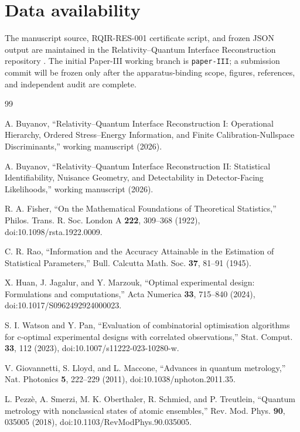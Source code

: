 \section*{Data availability}
The manuscript source, RQIR-RES-001 certificate script, and frozen JSON output are maintained in the Relativity--Quantum Interface Reconstruction repository \cite{RQIRRepo}. The initial Paper-III working branch is \texttt{paper-III}; a submission commit will be frozen only after the apparatus-binding scope, figures, references, and independent audit are complete.

\begin{thebibliography}{99}

A. Buyanov,
``Relativity--Quantum Interface Reconstruction I: Operational Hierarchy, Ordered Stress--Energy Information, and Finite Calibration-Nullspace Discriminants,''
working manuscript (2026).

A. Buyanov,
``Relativity--Quantum Interface Reconstruction II: Statistical Identifiability, Nuisance Geometry, and Detectability in Detector-Facing Likelihoods,''
working manuscript (2026).

R. A. Fisher,
``On the Mathematical Foundations of Theoretical Statistics,''
Philos. Trans. R. Soc. London A \textbf{222}, 309--368 (1922),
doi:10.1098/rsta.1922.0009.

C. R. Rao,
``Information and the Accuracy Attainable in the Estimation of Statistical Parameters,''
Bull. Calcutta Math. Soc. \textbf{37}, 81--91 (1945).

X. Huan, J. Jagalur, and Y. Marzouk,
``Optimal experimental design: Formulations and computations,''
Acta Numerica \textbf{33}, 715--840 (2024),
doi:10.1017/S0962492924000023.

S. I. Watson and Y. Pan,
``Evaluation of combinatorial optimisation algorithms for c-optimal experimental designs with correlated observations,''
Stat. Comput. \textbf{33}, 112 (2023),
doi:10.1007/s11222-023-10280-w.

V. Giovannetti, S. Lloyd, and L. Maccone,
``Advances in quantum metrology,''
Nat. Photonics \textbf{5}, 222--229 (2011),
doi:10.1038/nphoton.2011.35.

L. Pezz\`e, A. Smerzi, M. K. Oberthaler, R. Schmied, and P. Treutlein,
``Quantum metrology with nonclassical states of atomic ensembles,''
Rev. Mod. Phys. \textbf{90}, 035005 (2018),
doi:10.1103/RevModPhys.90.035005.


\end{thebibliography}

